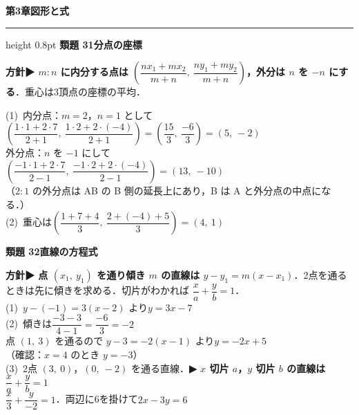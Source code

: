 \documentclass[a4paper,11pt]{ltjsarticle}
\newcommand{\ans}[2]{\Needspace{5\baselineskip}\vspace{6pt}%
  {\sffamily\bfseries 類題 #1\quad #2}\par}
\newcommand{\point}[1]{\textsf{\bfseries ▶ #1}}
\newcommand{\ax}[4]{\draw[->] (#1,0)--(#2,0) node[right]{\scriptsize $x$};
  \draw[->] (0,#3)--(0,#4) node[above]{\scriptsize $y$};
  \node[below left] at (0,0){\scriptsize O};}
\newcommand{\shouans}[2]{\Needspace{8\baselineskip}\vspace{10pt}\markboth{解答\quad #1\quad #2}{}%
  {\sffamily\bfseries\Large #1\quad #2\par}\vspace{2pt}\hrule height 0.8pt\vspace{2pt}}
\begin{document}
\shouans{第3章}{図形と式}
\ans{31}{分点の座標}
\begin{kai}
\textbf{方針}\quad \point{$m:n$ に内分する点は $\left(\dfrac{nx_1+mx_2}{m+n},\ \dfrac{ny_1+my_2}{m+n}\right)$，外分は $n$ を $-n$ にする}．重心は3頂点の座標の平均．\\[2pt]
\begin{center}
\end{center}
(1)\ 内分点：$m=2$，$n=1$ として\\
\hspace*{1.5em}$\left(\dfrac{1\cdot1+2\cdot7}{2+1},\ \dfrac{1\cdot2+2\cdot(-4)}{2+1}\right)=\left(\dfrac{15}3,\ \dfrac{-6}3\right)=(5,\ -2)$\\[2pt]
\hspace*{1.5em}外分点：$n$ を $-1$ にして\\
\hspace*{1.5em}$\left(\dfrac{-1\cdot1+2\cdot7}{2-1},\ \dfrac{-1\cdot2+2\cdot(-4)}{2-1}\right)=(13,\ -10)$\\
\hspace*{1.5em}（$2:1$ の外分点は AB の B 側の延長上にあり，B は A と外分点の中点になる．）\\[2pt]
(2)\ 重心は\quad $\left(\dfrac{1+7+4}3,\ \dfrac{2+(-4)+5}3\right)=(4,\ 1)$
\end{kai}

\ans{32}{直線の方程式}
\begin{kai}
\textbf{方針}\quad \point{点 $(x_1,\ y_1)$ を通り傾き $m$ の直線は $y-y_1=m(x-x_1)$}．2点を通るときは先に傾きを求める．切片がわかれば $\dfrac xa+\dfrac yb=1$．\\[2pt]
(1)\ $y-(-1)=3(x-2)$ より\quad $y=3x-7$\\[2pt]
(2)\ 傾きは\quad $\dfrac{-3-3}{4-1}=\dfrac{-6}3=-2$\\
\hspace*{1.5em}点 $(1,\ 3)$ を通るので $y-3=-2(x-1)$ より\quad $y=-2x+5$\\
\hspace*{1.5em}（確認：$x=4$ のとき $y=-3$）\\[2pt]
(3)\ 2点 $(3,\ 0)$，$(0,\ -2)$ を通る直線．\point{$x$ 切片 $a$，$y$ 切片 $b$ の直線は $\dfrac xa+\dfrac yb=1$}\\
\hspace*{1.5em}$\dfrac x3+\dfrac y{-2}=1$．両辺に6を掛けて\quad $2x-3y=6$
\end{kai}
\end{document}
